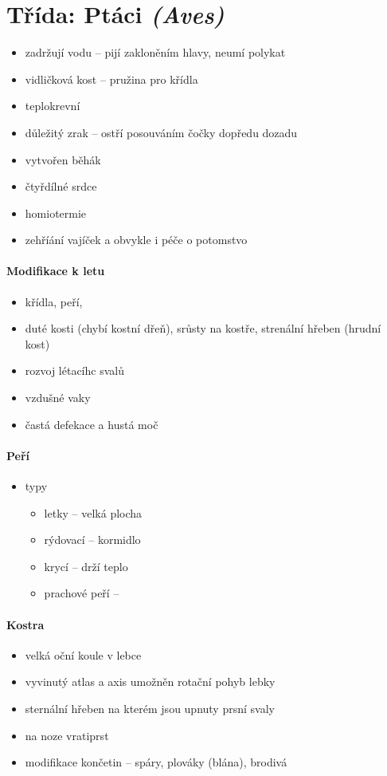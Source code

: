 \section{Třída: Ptáci \textit{(Aves)}}
\begin{itemize}
\item zadržují vodu -- pijí zakloněním hlavy, neumí polykat
\item vidličková kost -- pružina pro křídla
\item teplokrevní
\item důležitý zrak -- ostří posouváním čočky dopředu dozadu
\item vytvořen běhák
\item čtyřdílné srdce
\item homiotermie
\item zehříání vajíček a obvykle i péče o potomstvo
\end{itemize}

\paragraph{Modifikace k letu}
\begin{itemize}
\item křídla, peří, 
\item duté kosti (chybí kostní dřeň), srůsty na kostře, strenální hřeben (hrudní kost)
\item rozvoj létacíhc svalů
\item vzdušné vaky
\item častá defekace a hustá moč

\end{itemize}

\paragraph{Peří}
\begin{itemize}
\item typy
	\begin{itemize}
	\item letky -- velká plocha
	\item rýdovací -- kormidlo
	\item krycí -- drží teplo
	\item prachové peří -- 
	\end{itemize}
\end{itemize}

\paragraph{Kostra}
\begin{itemize}
\item velká oční koule v lebce
\item vyvinutý atlas a axis \ra umožněn rotační pohyb lebky
\item sternální hřeben na kterém jsou upnuty prsní svaly
\item na noze vratiprst
\item modifikace končetin -- spáry, plováky (blána), brodivá
\end{itemize}

